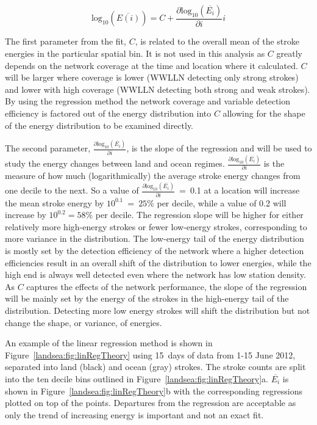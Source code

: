 \begin{equation}
\text{log}_{10}(\overline{E(i)}) = C + \frac{\partial \text{log}_{10}(\overline{E_i})}{\partial i} i
\end{equation}

The first parameter from the fit, $C$, is related to the overall mean of the stroke energies in the particular spatial bin.
It is not used in this analysis as $C$ greatly depends on the network coverage at the time and location where it calculated.
$C$ will be larger where coverage is lower (WWLLN detecting only strong strokes) and lower with high coverage (WWLLN detecting both strong and weak strokes).
By using the regression method the network coverage and variable detection efficiency is factored out of the energy distribution into $C$ allowing for the shape of the energy distribution to be examined directly.

The second parameter, $\frac{\partial \text{log}_{10}(\overline{E_i})}{\partial i}$, is the slope of the regression and will be used to study the energy changes between land and ocean regimes.
$\frac{\partial \text{log}_{10}(\overline{E_i})}{\partial i}$ is the measure of how much (logarithmically) the average stroke energy changes from one decile to the next.
So a value of $\frac{\partial \text{log}_{10}(\overline{E_i})}{\partial i}$~=~0.1 at a location will increase the mean stroke energy by $10^{0.1}~=~25\%$ per decile, while a value of 0.2 will increase by $10^{0.2} = 58\%$ per decile.
The regression slope will be higher for either relatively more high-energy strokes or fewer low-energy strokes, corresponding to more variance in the distribution.
The low-energy tail of the energy distribution is mostly set by the detection efficiency of the network where a higher detection efficiencies result in an overall shift of the distribution to lower energies, while the high end is always well detected even where the network has low station density.
As $C$ captures the effects of the network performance, the slope of the regression will be mainly set by the energy of the strokes in the high-energy tail of the distribution.
Detecting more low energy strokes will shift the distribution but not change the shape, or variance, of energies.

An example of the linear regression method is shown in Figure~\ref{landsea:fig:linRegTheory} using 15~days of data from 1-15 June 2012, separated into land (black) and ocean (gray) strokes.
The stroke counts are split into the ten decile bins outlined in Figure~\ref{landsea:fig:linRegTheory}a.
$\overline{E_i}$ is shown in Figure~\ref{landsea:fig:linRegTheory}b with the corresponding regressions plotted on top of the points.
Departures from the regression are acceptable as only the trend of increasing energy is important and not an exact fit.

